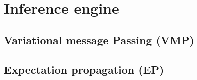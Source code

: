 \section{Inference engine} \label{sec:InferenceEngine}


\subsection{Variational message Passing (VMP)} \label{VMP}


\subsection{Expectation propagation (EP)} \label{EP}
